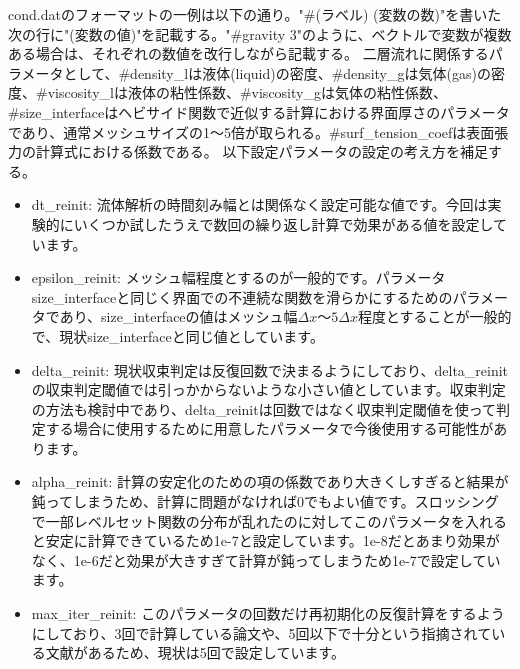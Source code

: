cond.datのフォーマットの一例は以下の通り。"\#(ラベル) (変数の数)"を書いた次の行に"(変数の値)"を記載する。"\#gravity 3"のように、ベクトルで変数が複数ある場合は、それぞれの数値を改行しながら記載する。
二層流れに関係するパラメータとして、\#density\_lは液体(liquid)の密度、\#density\_gは気体(gas)の密度、\#viscosity\_lは液体の粘性係数、\#viscosity\_gは気体の粘性係数、\#size\_interfaceはヘビサイド関数で近似する計算における界面厚さのパラメータであり、通常メッシュサイズの1～5倍が取られる。\#surf\_tension\_coefは表面張力の計算式における係数である。
以下設定パラメータの設定の考え方を補足する。
\begin{itemize}
\item dt\_reinit: 流体解析の時間刻み幅とは関係なく設定可能な値です。今回は実験的にいくつか試したうえで数回の繰り返し計算で効果がある値を設定しています。
\item epsilon\_reinit: メッシュ幅程度とするのが一般的です。パラメータsize\_interfaceと同じく界面での不連続な関数を滑らかにするためのパラメータであり、size\_interfaceの値はメッシュ幅$\Delta x$～$5\Delta x$程度とすることが一般的で、現状size\_interfaceと同じ値としています。
\item delta\_reinit: 現状収束判定は反復回数で決まるようにしており、delta\_reinitの収束判定閾値では引っかからないような小さい値としています。収束判定の方法も検討中であり、delta\_reinitは回数ではなく収束判定閾値を使って判定する場合に使用するために用意したパラメータで今後使用する可能性があります。
\item alpha\_reinit: 計算の安定化のための項の係数であり大きくしすぎると結果が鈍ってしまうため、計算に問題がなければ0でもよい値です。スロッシングで一部レベルセット関数の分布が乱れたのに対してこのパラメータを入れると安定に計算できているため1e-7と設定しています。1e-8だとあまり効果がなく、1e-6だと効果が大きすぎて計算が鈍ってしまうため1e-7で設定しています。
\item max\_iter\_reinit: このパラメータの回数だけ再初期化の反復計算をするようにしており、3回で計算している論文や、5回以下で十分という指摘されている文献があるため、現状は5回で設定しています。
\end{itemize}


